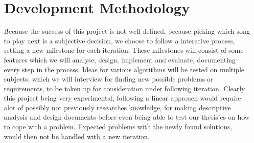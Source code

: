 \chapter{Development Methodology}

Because the success of this project is not well defined, because picking which song to play next is a subjective decision, we choose to follow a interative process, setting a new milestone for each iteration. These milestones will consist of some features which we will analyse, design, implement and evaluate, documenting every step in the process. Ideas for various algorithms will be tested on multiple subjects, which we will interview for finding new possible problems or requirements, to be taken up for consideration under following iteration.
Clearly this project being very experimental, following a linear approach would require alot of possibly not previously researches knowledge, for making descriptive analysis and design documents before even being able to test our thesis'es on how to cope with a problem. Expected problems with the newly found solutions, would then not be handled with a new iteration.